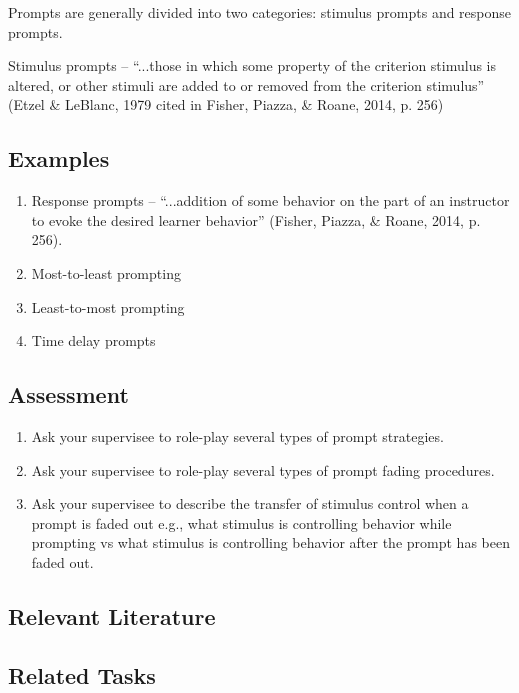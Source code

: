 Prompts are generally divided into two categories: stimulus prompts and response prompts.

Stimulus prompts – ``...those in which some property of the criterion stimulus is altered, or other stimuli are added to or removed from the criterion stimulus'' (Etzel \& LeBlanc, 1979 cited in Fisher, Piazza, \& Roane, 2014, p. 256)
\subsection{Examples}
\begin{enumerate}
\item Response prompts – ``...addition of some behavior on the part of an instructor to evoke the desired learner behavior'' (Fisher, Piazza, \& Roane, 2014, p. 256).
\item Most-to-least prompting
\item Least-to-most prompting
\item Time delay prompts
\end{enumerate}
%
\subsection{Assessment}
\begin{enumerate}
\item Ask your supervisee to role-play several types of prompt strategies.
\item Ask your supervisee to role-play several types of prompt fading procedures.
\item Ask your supervisee to describe the transfer of stimulus control when a prompt is faded out e.g., what stimulus is controlling behavior while prompting vs what stimulus is controlling behavior after the prompt has been faded out.
\end{enumerate}
%
\subsection{Relevant Literature}
\begin{refsection}
\nocite{etzel1979simplest,
    fisher2014handbook,
    walker2008constant}
\printbibliography[heading=none]
\end{refsection}
%
\subsection{Related Tasks}
\fourdFour{}\\
\fourdFive{}\\
\fourdSix{}\\
\fourdSeven{}\\
\fourdEight{}\\
\foureOne{}\\
\foureTwo{}\\
\foureThirteen{}\\
\fourFKTwentyFour{}\\
%
%
%
%
%
%
